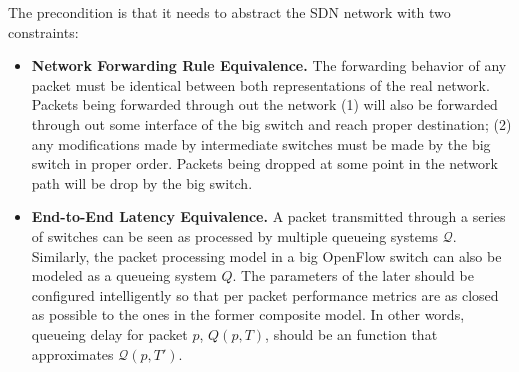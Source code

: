The precondition is that it needs to abstract the SDN network with two constraints:
\begin{itemize}
\item \textbf{Network Forwarding Rule Equivalence.}
        The forwarding behavior of any packet must be identical
        between both representations of the real network. Packets being
        forwarded through out the network (1) will also be forwarded through out
        some interface of the big switch and reach proper destination;
        (2) any modifications made by intermediate switches must be made by the
        big switch in proper order.
        Packets being dropped at some point in the network path will be drop by the
        big switch.
\item \textbf{End-to-End Latency Equivalence.}
        A packet transmitted through a series of
        switches can be seen as processed by multiple queueing systems $\mathcal{Q}$.
        Similarly, the packet processing model in a big OpenFlow switch can
        also be modeled as a queueing system $Q$.
        The parameters of the later should be configured intelligently
        so that per packet performance metrics are as closed as possible to the ones
        in the former composite model.
        In other words, queueing delay for packet $p$, $Q(p, T)$, should be an
        function that approximates $\mathcal{Q}(p, T')$.
\end{itemize}
\fi
